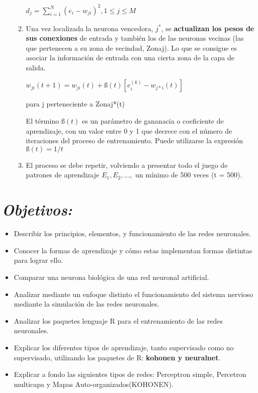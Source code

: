 \documentclass[journal]{IEEEtran}
\begin{document}
\begin{enumerate}
\begin{enumerate}
\begin{center}
$d_{j} = \sum_{i=1}^{N}(e_{i} - w_{ji})^2 , 1 \leq j \leq M$
\end{center}

\item Una vez localizada la neurona vencedora, $j^{*}$, se \textbf{actualizan los pesos de sus conexiones} de entrada y también los de las neuronas vecinas (las que pertenecen a su zona de vecindad, Zonaj). Lo que se consigue es asociar la información de entrada con una cierta zona de la capa de salida.

\begin{center}
$w_{ji}(t+1) = w_{ji}(t) + ß(t)[e_{i}^{(k)} - w_{j*i}(t)]$
\end{center}

para j perteneciente a Zonaj*(t)

El término $ß(t)$ es un parámetro de gananacia o coeficiente de aprendizaje, con un valor entre 0 y 1 que decrece con el número de iteraciones del proceso de entrenamiento. Puede utilizarse la expresión $ß(t) = 1/t$\\

\item El proceso se debe repetir, volviendo a presentar todo el juego de patrones de aprendizaje $E_{1}, E_{2},...,$ un mínimo de 500 veces (t = 500).\\
\end{enumerate}
\end{enumerate}
  
\section{\textbf{\emph{Objetivos:}}}

\begin{itemize}
\item Describir los principios, elementos, y funcionamiento de las redes neuronales.
        
\item Conocer la formas de aprendizaje y cómo estas implementan formas distintas para lograr ello.

\item Comparar una neurona biológica de una red neuronal artificial.
        
\item Analizar mediante un enfoque distinto el funcionamiento del sistema nervioso mediante la simulación de las redes neuronales.

\item Analizar los paquetes lenguaje R para el entrenamiento de las redes neuronales.

\item Explicar los diferentes tipos de aprendizaje, tanto supervisado como no supervisado, utilizando los paquetes de R: \textbf{kohonen y neuralnet}.

 \item Explicar a fondo las siguientes tipos de redes: Perceptron simple, Percetron multicapa y Mapas Auto-organizados(KOHONEN).
\end{itemize}
  
\end{document}
